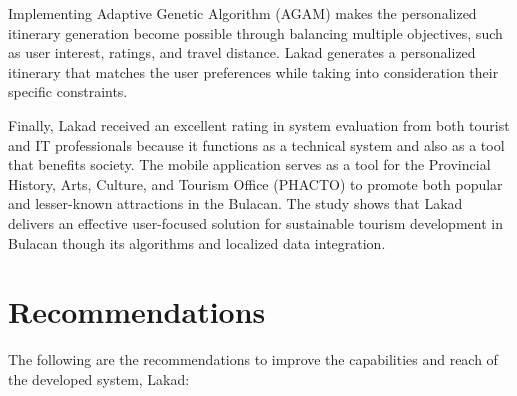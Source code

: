 Implementing Adaptive Genetic Algorithm (AGAM) makes the personalized itinerary generation become possible through balancing multiple objectives, such as user interest, ratings, and travel distance. Lakad generates a personalized itinerary that matches the user preferences while taking into consideration their specific constraints.

Finally, Lakad received an excellent rating in system evaluation from both tourist and IT professionals because it functions as a technical system and also as a tool that benefits society. The mobile application serves as a tool for the Provincial History, Arts, Culture, and Tourism Office (PHACTO)  to promote both popular and lesser-known attractions in the Bulacan. The study shows that  Lakad delivers an effective user-focused solution for sustainable tourism development  in Bulacan though its algorithms and localized data integration.

\section{Recommendations}

The following are the recommendations to improve the capabilities and reach of the developed system, Lakad:

